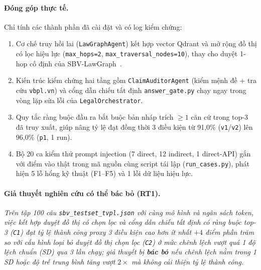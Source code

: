 \documentclass[sigconf,nonacm]{acmart}
\begin{document}
\paragraph{Đóng góp thực tế.}
Chỉ tính các thành phần đã cài đặt và có log kiểm chứng:
\begin{enumerate}[leftmargin=*]
  \item Cơ chế truy hồi lai (\texttt{LawGraphAgent}) kết hợp vector Qdrant và mở rộng đồ thị có lọc hiệu lực (\texttt{max\_hops=2}, \texttt{max\_traversal\_nodes=10}), thay cho duyệt 1-hop cố định của SBV-LawGraph~\cite{phan2026sbv}.
  \item Kiến trúc kiểm chứng hai tầng gồm \texttt{ClaimAuditorAgent} (kiểm mệnh đề + tra cứu \texttt{vbpl.vn}) và cổng dẫn chiếu tất định \texttt{answer\_gate.py} chạy ngay trong vòng lặp sửa lỗi của \texttt{LegalOrchestrator}.
  \item Quy tắc ràng buộc đầu ra bắt buộc bản nháp trích $\geq 1$ căn cứ trong top-3 đã truy xuất, giúp nâng tỷ lệ đạt đồng thời 3 điều kiện từ 91,0\% (\texttt{v1}/\texttt{v2}) lên 96,0\% (\texttt{p1}, 1 run).
  \item Bộ 20 ca kiểm thử prompt injection (7 direct, 12 indirect, 1 direct-API) gắn với điểm vào thật trong mã nguồn cùng script tái lập (\texttt{run\_cases.py}), phát hiện 5 lỗ hổng kỹ thuật (F1--F5) và 1 lỗi dữ liệu hiệu lực.
\end{enumerate}

\paragraph{Giả thuyết nghiên cứu có thể bác bỏ (RT1).}
\emph{Trên tập 100 câu \texttt{sbv\_testset\_tvpl.json} với cùng mô hình và ngân sách token, việc kết hợp duyệt đồ thị có chọn lọc và cổng dẫn chiếu tất định có ràng buộc top-3 (\texttt{C1}) đạt tỷ lệ thành công proxy 3 điều kiện cao hơn ít nhất $+4$ điểm phần trăm so với cấu hình loại bỏ duyệt đồ thị chọn lọc (\texttt{C2}) ở mức chênh lệch vượt quá 1 độ lệch chuẩn (SD) qua 3 lần chạy; giả thuyết bị \textbf{bác bỏ} nếu chênh lệch nằm trong 1 SD hoặc độ trễ trung bình tăng vượt $2\times$ mà không cải thiện tỷ lệ thành công.}
\end{document}

